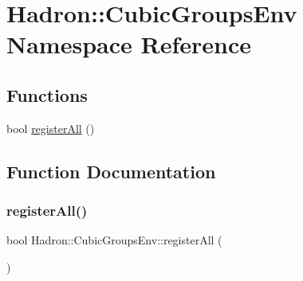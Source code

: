 \hypertarget{namespaceHadron_1_1CubicGroupsEnv}{}\section{Hadron\+:\+:Cubic\+Groups\+Env Namespace Reference}
\label{namespaceHadron_1_1CubicGroupsEnv}
\subsection*{Functions}
\begin{DoxyCompactItemize}
\item 
bool \mbox{\hyperlink{namespaceHadron_1_1CubicGroupsEnv_a72c88213059f1ce4ac24ef0b5032307b}{register\+All}} ()
\end{DoxyCompactItemize}


\subsection{Function Documentation}
\mbox{\label{namespaceHadron_1_1CubicGroupsEnv_a72c88213059f1ce4ac24ef0b5032307b}} 
\subsubsection{\texorpdfstring{registerAll()}{registerAll()}}
{\footnotesize\ttfamily bool Hadron\+::\+Cubic\+Groups\+Env\+::register\+All (\begin{DoxyParamCaption}{ }\end{DoxyParamCaption})}

